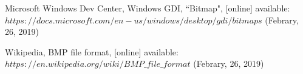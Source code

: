 \documentclass[UTF8]{ctexart}
\begin{document}
\newpage
\begin{thebibliography}{}
     Microsoft Windows Dev Center, 
    Windows GDI, ``Bitmap", [online] available: 
    \newline $https://docs.microsoft.com/en-us/windows/desktop/gdi/bitmaps$  
    (Febrary, 26, 2019)

	 Wikipedia, BMP file format, [online] available: \newline 
	$https://en.wikipedia.org/wiki/BMP\_file\_format$ (Febrary, 26, 2019)

\end{thebibliography}

\clearpage
\end{document}
